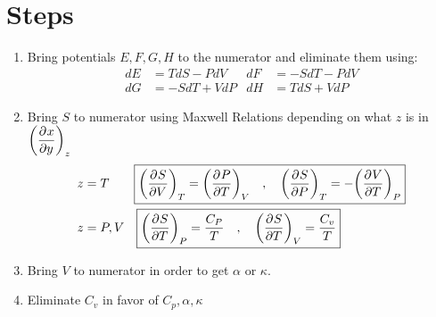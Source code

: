 \documentclass{article}
\begin{document}
\section{Steps}
    \begin{enumerate}
        \item Bring potentials $E,F,G,H$ to the numerator and eliminate them using:
        \begin{align*}
            dE&=TdS-PdV
            &
            dF&=-SdT-PdV
            \\
            dG&=-SdT+VdP
            &
            dH&=TdS+VdP
        \end{align*}
        \item Bring $S$ to numerator using Maxwell Relations depending on what $z$ is in $\displaystyle\pder{x}{y}[z]$
        \begin{align*}
            z&=T\qquad\boxed{\pder{S}{V}[T]=\pder{P}{T}[V]\quad,\quad \pder{S}{P}[T]=-\pder{V}{T}[P]}
            \\
            z&=P,V\quad\boxed{\pder{S}{T}[P]=\frac{C_P}{T}\quad,\quad \pder{S}{T}[V]=\frac{C_v}{T}}
        \end{align*}
        \item Bring $V$ to numerator in order to get $\alpha$ or $\kappa$. 
        \item Eliminate $C_v$ in favor of $C_p,\alpha,\kappa$
    \end{enumerate} 
\end{document}
